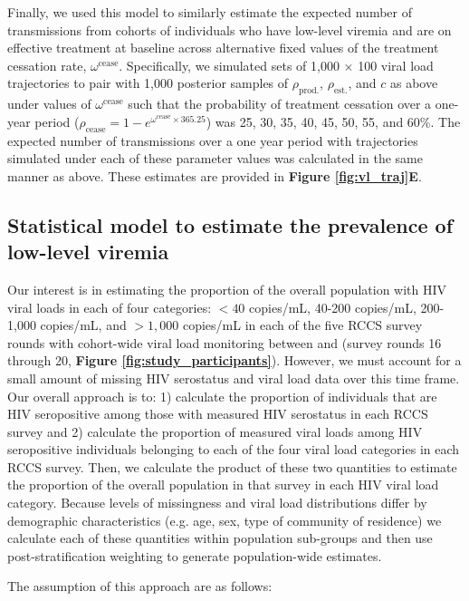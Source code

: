 \documentclass{article}[11pt]
\newcommand{\var}[1]{\DTLfetch{\mydata}{var}{#1}{val}}
\begin{document}
Finally, we used this model to similarly estimate the expected number of transmissions from cohorts of individuals who have low-level viremia and are on effective treatment at baseline across alternative fixed values of the treatment cessation rate, $\omega^\text{cease}$. Specifically, we simulated sets of 1,000 $\times$ 100 viral load trajectories to pair with 1,000 posterior samples of $\rho_\text{prod.}$, $\rho_\text{est.}$, and $c$ as above under values of $\omega^\text{cease}$ such that the probability of treatment cessation over a one-year period ($\rho_\text{cease} = 1 - e^{\omega^\text{cease}\times 365.25}$) was 25, 30, 35, 40, 45, 50, 55, and 60\%. The expected number of transmissions over a one year period with trajectories simulated under each of these parameter values was calculated in the same manner as above. These estimates are provided in \textbf{Figure \ref{fig:vl_traj}E}.


\subsection*{Statistical model to estimate the prevalence of low-level viremia}
Our interest is in estimating the proportion of the overall population with HIV viral loads in each of four categories: $<40$ copies/mL, 40-200 copies/mL, 200-1,000 copies/mL, and $>1,000$ copies/mL in each of the five RCCS survey rounds with cohort-wide viral load monitoring between \var{r16_minDate} and \var{r20_maxDate} (survey rounds 16 through 20, \textbf{Figure \ref{fig:study_participants}}). However, we must account for a small amount of missing HIV serostatus and viral load data over this time frame. Our overall approach is to: 1) calculate the proportion of individuals that are HIV seropositive among those with measured HIV serostatus in each RCCS survey and 2) calculate the proportion of measured viral loads among HIV seropositive individuals belonging to each of the four viral load categories in each RCCS survey. Then, we calculate the product of these two quantities to estimate the proportion of the overall population in that survey in each HIV viral load category. Because levels of missingness and viral load distributions differ by demographic characteristics (e.g. age, sex, type of community of residence) we calculate each of these quantities within population sub-groups and then use post-stratification weighting to generate population-wide estimates. 

The assumption of this approach are as follows:
\end{document}
